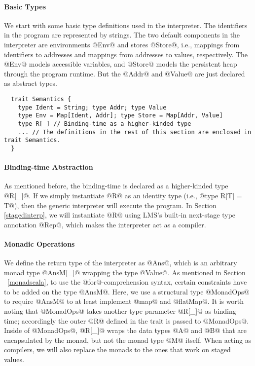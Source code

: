 \paragraph{Basic Types} We start with some basic type definitions used in the
interpreter. The identifiers in the program are represented by strings. The two
default components in the interpreter are environments @Env@ and stores @Store@,
i.e., mappings from identifiers to addresses and mappings from addresses to
values, respectively. The @Env@ models accessible variables, and @Store@ models
the persistent heap through the program runtime. But the @Addr@ and @Value@ are
just declared as abstract types.

\begin{lstlisting}
  trait Semantics {
    type Ident = String; type Addr; type Value
    type Env = Map[Ident, Addr]; type Store = Map[Addr, Value]
    type R[_] // Binding-time as a higher-kinded type
    ... // The definitions in the rest of this section are enclosed in trait Semantics.
  }
\end{lstlisting}

\paragraph{Binding-time Abstraction} As mentioned before, the binding-time is
declared as a higher-kinded type @R[_]@. If we simply instantiate @R@ as an identity
type (i.e., @type R[T] = T@), then the generic interpreter will execute the program.
In Section \ref{stagedinterp}, we will instantiate @R@ using LMS's built-in
next-stage type annotation @Rep@, which makes the interpreter act as a compiler.

\paragraph{Monadic Operations} We define the return type of the interpreter as
@Ans@, which is an arbitrary monad type @AnsM[_]@ wrapping the type @Value@. 
As mentioned in Section ~\ref{monadscala}, to use the @for@-comprehension
syntax, certain constraints have to be added on the type @AnsM@. Here, we use a
structural type @MonadOps@ to require @AnsM@ to at least implement @map@ and
@flatMap@. It is worth noting that @MonadOps@ takes another type parameter
@R[_]@ as binding-time; accordingly the outer @R@ defined in the trait is passed
to @MonadOps@. Inside of @MonadOps@, @R[_]@ wraps the data types @A@ and @B@ that are
encapsulated by the monad, but not the monad type @M@ itself. When acting as
compilers, we will also replace the monads to the ones that work on staged
values.

